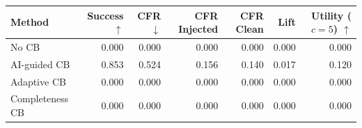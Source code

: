 \begin{tabular}{lrrrrrr}
\toprule
Method & Success $\uparrow$ & CFR $\downarrow$ & CFR Injected & CFR Clean & Lift & Utility ($c=5$) $\uparrow$ \\
\midrule
No CB & 0.000 & 0.000 & 0.000 & 0.000 & 0.000 & 0.000 \\
AI-guided CB & 0.853 & 0.524 & 0.156 & 0.140 & 0.017 & 0.120 \\
Adaptive CB & 0.000 & 0.000 & 0.000 & 0.000 & 0.000 & 0.000 \\
Completeness CB & 0.000 & 0.000 & 0.000 & 0.000 & 0.000 & 0.000 \\
\bottomrule
\end{tabular}
